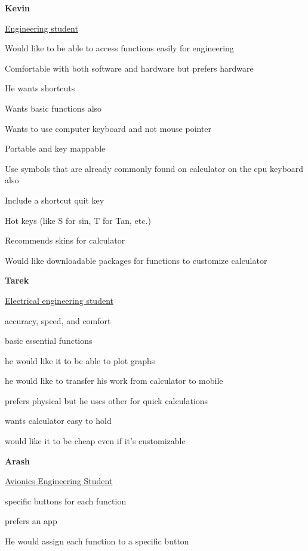 \documentclass[a4paper]{article}
\begin{document}
\textbf{Kevin}

\underline{Engineering student}

\begin{compactitem}
\item Would like to be able to access functions easily for engineering 
\item Comfortable with both software and hardware but prefers hardware
\item He wants shortcuts
\item Wants basic functions also
\item Wants to use computer keyboard and not mouse pointer
\item Portable and key mappable
\item Use symbols that are already commonly found on calculator on the cpu keyboard also 
\item Include a shortcut quit key
\item Hot keys (like S for sin, T for Tan, etc.)
\item Recommends skins for calculator
\item Would like downloadable packages for functions to customize calculator
\end{compactitem}
\bigskip

\textbf{Tarek}

\underline{Electrical engineering student}

\begin{compactitem}
\item accuracy, speed, and comfort
\item basic essential functions
\item he would like it to be able to plot graphs 
\item he would like to transfer his work from calculator to mobile
\item prefers physical but he uses other for quick calculations
\item wants calculator easy to hold
\item would like it to be cheap even if it’s customizable
\end{compactitem}
\bigskip

\textbf{Arash}

\underline{Avionics Engineering Student}

\begin{compactitem}
\item specific buttons for each function
\item prefers an app 
\item He would assign each function to a specific button
\end{compactitem}
\end{document}

